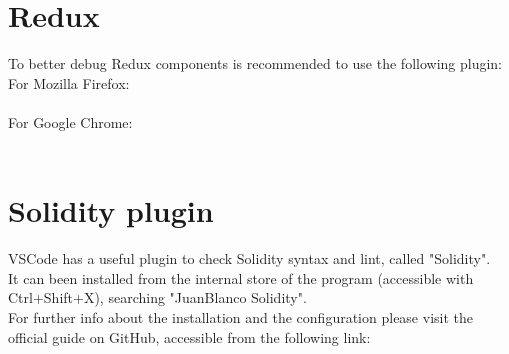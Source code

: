 \documentclass[ManualeSviluppatore.tex]{subfiles}
\begin{document}
\section{Redux}
To better debug Redux components is recommended to use the following plugin: \\
For Mozilla Firefox: \\
 \\
For Google Chrome: \\
 \\

\section{Solidity plugin}
VSCode has a useful plugin to check Solidity syntax and lint, called "Solidity".\\
It can been installed from the internal store of the program (accessible with Ctrl+Shift+X), searching "JuanBlanco Solidity". \\
For further info about the installation and the configuration please visit the official guide on GitHub, accessible from the following link:
\end{document}
